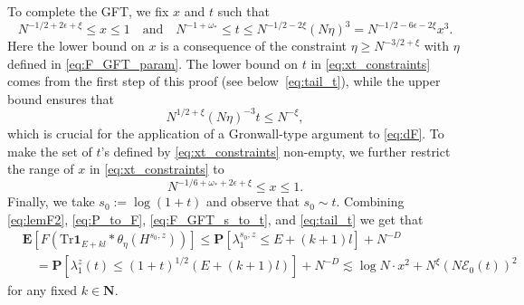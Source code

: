 \documentclass[10pt]{amsart}
\numberwithin{equation}{section}
\newcommand{\E}{\mathbf{E}}
\newcommand{\N}{\mathbf{N}}
\begin{document}
To complete the GFT, we fix $x$ and $t$ such that
\begin{equation}
N^{-1/2+2\epsilon+\xi}\le x\le 1\quad \text{and}\quad N^{-1+\omega_*}\le t\le N^{-1/2-2\xi}(N\eta)^3=N^{-1/2-6\epsilon-2\xi}x^3.
\label{eq:xt_constraints}
\end{equation}
Here the lower bound on $x$ is a consequence of the constraint $\eta\ge N^{-3/2+\xi}$ with $\eta$ defined in \eqref{eq:F_GFT_param}. The lower bound on $t$ in \eqref{eq:xt_constraints} comes from the first step of this proof (see below~\eqref{eq:tail_t}), while the upper bound ensures that
\begin{equation}
N^{1/2+\xi}(N\eta)^{-3}t\le N^{-\xi},
\label{eq:F_GFT_propag}
\end{equation}
which is crucial for the application of a Gronwall-type argument to \eqref{eq:dF}. To make the set of $t$'s defined by \eqref{eq:xt_constraints} non-empty, we further restrict the range of $x$ in \eqref{eq:xt_constraints} to
\begin{equation}
N^{-1/6+\omega_*+2\epsilon +\xi}\le x\le 1.
\end{equation}
Finally, we take $s_0:=\log (1+t)$ and observe that $s_0\sim t$. Combining \eqref{eq:lemF2}, \eqref{eq:P_to_F}, \eqref{eq:F_GFT_s_to_t}, and \eqref{eq:tail_t} we get that
\begin{equation}
\begin{split}
&\E \left[ F\left(\mathrm{Tr}\bm{1}_{E+kl}*\theta_\eta(H^{s_0,z})\right)\right]\le \mathbf{P}\left[\lambda_1^{s_0,z}\le E+(k+1)l\right]+N^{-D}\\
&\quad = \mathbf{P}\left[\lambda_1^{z}(t)\le (1+t)^{1/2}\left(E+(k+1)l\right)\right]+N^{-D}\lesssim \log N\cdot x^2 + N^\xi (N\mathcal{E}_0(t))^2 
\end{split}
\label{eq:tail_s0}
\end{equation}
for any fixed $k\in\N$. 
\end{document}
